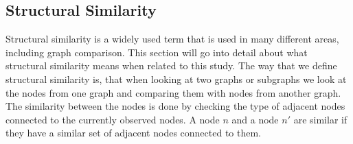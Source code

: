 \subsection{Structural Similarity}
\label{Subsec:structural_similarity}
Structural similarity is a widely used term that is used in many different areas, including graph comparison. This section will go into detail about what structural similarity means when related to this study.
The way that we define structural similarity is, that when looking at two graphs or subgraphs we look at the nodes from one graph and comparing them with nodes from another graph. The similarity between the nodes is done by checking the type of adjacent nodes connected to the currently observed nodes. 
A node $n$ and a node $n'$ are similar if they have a similar set of adjacent nodes connected to them.


